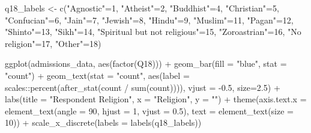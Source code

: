 \documentclass[
  letterpaper,
  DIV=11,
  numbers=noendperiod]{scrartcl}
\newenvironment{Shaded}{\begin{snugshade}}{\end{snugshade}}
\newcommand{\AttributeTok}[1]{\textcolor[rgb]{0.40,0.45,0.13}{#1}}
\newcommand{\DecValTok}[1]{\textcolor[rgb]{0.68,0.00,0.00}{#1}}
\newcommand{\FloatTok}[1]{\textcolor[rgb]{0.68,0.00,0.00}{#1}}
\newcommand{\FunctionTok}[1]{\textcolor[rgb]{0.28,0.35,0.67}{#1}}
\newcommand{\NormalTok}[1]{\textcolor[rgb]{0.00,0.23,0.31}{#1}}
\newcommand{\OtherTok}[1]{\textcolor[rgb]{0.00,0.23,0.31}{#1}}
\newcommand{\SpecialCharTok}[1]{\textcolor[rgb]{0.37,0.37,0.37}{#1}}
\newcommand{\StringTok}[1]{\textcolor[rgb]{0.13,0.47,0.30}{#1}}
\begin{document}
\begin{Shaded}
\begin{Highlighting}[]
\NormalTok{q18\_labels }\OtherTok{\textless{}{-}} \FunctionTok{c}\NormalTok{(}\StringTok{"Agnostic"}\OtherTok{=}\DecValTok{1}\NormalTok{, }\StringTok{"Atheist"}\OtherTok{=}\DecValTok{2}\NormalTok{, }\StringTok{"Buddhist"}\OtherTok{=}\DecValTok{4}\NormalTok{, }\StringTok{"Christian"}\OtherTok{=}\DecValTok{5}\NormalTok{, }\StringTok{"Confucian"}\OtherTok{=}\DecValTok{6}\NormalTok{, }\StringTok{"Jain"}\OtherTok{=}\DecValTok{7}\NormalTok{, }\StringTok{"Jewish"}\OtherTok{=}\DecValTok{8}\NormalTok{, }\StringTok{"Hindu"}\OtherTok{=}\DecValTok{9}\NormalTok{, }\StringTok{"Muslim"}\OtherTok{=}\DecValTok{11}\NormalTok{, }\StringTok{"Pagan"}\OtherTok{=}\DecValTok{12}\NormalTok{, }\StringTok{"Shinto"}\OtherTok{=}\DecValTok{13}\NormalTok{, }\StringTok{"Sikh"}\OtherTok{=}\DecValTok{14}\NormalTok{, }\StringTok{"Spiritual but not religious"}\OtherTok{=}\DecValTok{15}\NormalTok{, }\StringTok{"Zoroastrian"}\OtherTok{=}\DecValTok{16}\NormalTok{, }\StringTok{"No religion"}\OtherTok{=}\DecValTok{17}\NormalTok{, }\StringTok{"Other"}\OtherTok{=}\DecValTok{18}\NormalTok{)}

\FunctionTok{ggplot}\NormalTok{(admissions\_data, }\FunctionTok{aes}\NormalTok{(}\FunctionTok{factor}\NormalTok{(Q18))) }\SpecialCharTok{+}
  \FunctionTok{geom\_bar}\NormalTok{(}\AttributeTok{fill =} \StringTok{"blue"}\NormalTok{, }\AttributeTok{stat =} \StringTok{"count"}\NormalTok{) }\SpecialCharTok{+}
  \FunctionTok{geom\_text}\NormalTok{(}\AttributeTok{stat =} \StringTok{"count"}\NormalTok{, }\FunctionTok{aes}\NormalTok{(}\AttributeTok{label =}\NormalTok{ scales}\SpecialCharTok{::}\FunctionTok{percent}\NormalTok{(}\FunctionTok{after\_stat}\NormalTok{(count }\SpecialCharTok{/} \FunctionTok{sum}\NormalTok{(count)))), }\AttributeTok{vjust =} \SpecialCharTok{{-}}\FloatTok{0.5}\NormalTok{, }\AttributeTok{size=}\FloatTok{2.5}\NormalTok{) }\SpecialCharTok{+}  
  \FunctionTok{labs}\NormalTok{(}\AttributeTok{title =} \StringTok{"Respondent Religion"}\NormalTok{, }\AttributeTok{x =} \StringTok{"Religion"}\NormalTok{, }\AttributeTok{y =} \StringTok{""}\NormalTok{) }\SpecialCharTok{+}
  \FunctionTok{theme}\NormalTok{(}\AttributeTok{axis.text.x =} \FunctionTok{element\_text}\NormalTok{(}\AttributeTok{angle =} \DecValTok{90}\NormalTok{, }\AttributeTok{hjust =} \DecValTok{1}\NormalTok{, }\AttributeTok{vjust =} \FloatTok{0.5}\NormalTok{), }\AttributeTok{text =} \FunctionTok{element\_text}\NormalTok{(}\AttributeTok{size =} \DecValTok{10}\NormalTok{)) }\SpecialCharTok{+}
  \FunctionTok{scale\_x\_discrete}\NormalTok{(}\AttributeTok{labels =} \FunctionTok{labels}\NormalTok{(q18\_labels))}
\end{Highlighting}
\end{Shaded}
\end{document}

